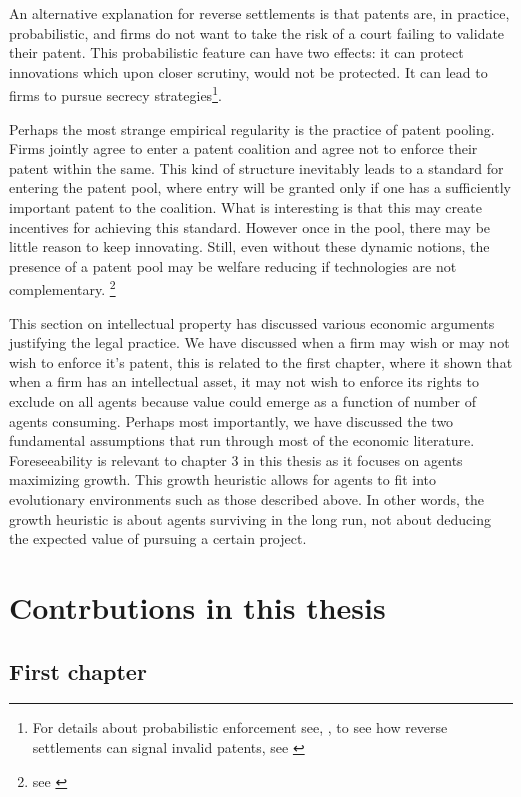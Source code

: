 An alternative explanation for reverse settlements is that patents are, in practice, probabilistic, and firms do not want to take the risk of a court failing to validate their patent. This probabilistic feature can have two effects: it can protect innovations which upon closer scrutiny, would not be protected. It can lead to firms to pursue secrecy strategies\footnote{For details about probabilistic enforcement see, \cite{Lemley2005}, to see how reverse settlements can signal invalid patents, see \cite{Dolin2011}}.

Perhaps the most strange empirical regularity is the practice of patent pooling. Firms jointly agree to enter a patent coalition and agree not to enforce their patent within the same. This kind of structure inevitably leads to a standard for entering the patent pool, where entry will be granted only if one has a sufficiently important patent to the coalition. What is interesting is that this may create incentives for achieving this standard. However once in the pool, there may be little reason to keep innovating. Still, even without these dynamic notions, the presence of a patent pool may be welfare reducing if technologies are not complementary. \footnote{see \cite{Lerner2004}}

This section on intellectual property has discussed various economic arguments justifying the legal practice. We have discussed when a firm may wish or may not wish to enforce it's patent, this is related to the first chapter, where it shown that when a firm has an intellectual asset, it may not wish to enforce its rights to exclude on all agents because value could emerge as a function of number of agents consuming. Perhaps most importantly, we have discussed the two fundamental assumptions that run through most of the economic literature. Foreseeability is relevant to chapter 3 in this thesis as it focuses on agents maximizing growth. This growth heuristic allows for agents to fit into evolutionary environments such as those described above. In other words, the growth heuristic is about agents surviving in the long run, not about deducing the expected value of pursuing a certain project. 

\newpage

\section{Contrbutions in this thesis}

\subsection{First chapter}

